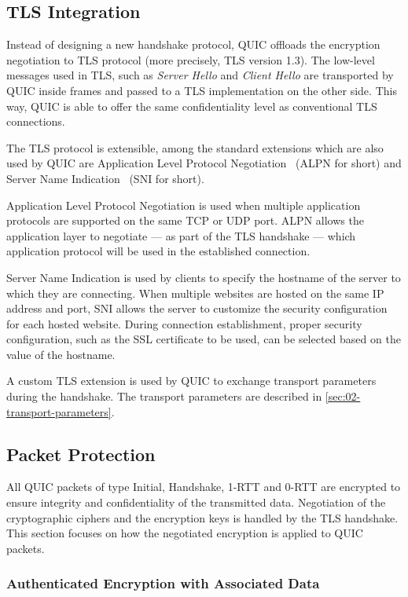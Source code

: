 \subsection{TLS Integration}

Instead of designing a new handshake protocol, QUIC offloads the encryption negotiation to TLS
protocol (more precisely, TLS version 1.3). The low-level messages used in TLS, such as
\textit{Server Hello} and \textit{Client Hello} are transported by QUIC inside \CRYPTO{} frames and
passed to a TLS implementation on the other side. This way, QUIC is able to offer the same
confidentiality level as conventional TLS connections.

The TLS protocol is extensible, among the standard extensions which are also used by QUIC are
Application Level Protocol Negotiation~\cite{rfc7301} (ALPN for short) and Server Name
Indication~\cite{rfc6066} (SNI for short).

Application Level Protocol Negotiation is used when multiple application protocols are supported on
the same TCP or UDP port. ALPN allows the application layer to negotiate --- as part of the TLS
handshake --- which application protocol will be used in the established connection.

Server Name Indication is used by clients to specify the hostname of the server to which they are
connecting. When multiple websites are hosted on the same IP address and port, SNI allows the server
to customize the security configuration for each hosted website. During connection establishment,
proper security configuration, such as the SSL certificate to be used, can be selected based on the
value of the hostname.

A custom TLS extension is used by QUIC to exchange transport parameters during the handshake. The
transport parameters are described in \autoref{sec:02-transport-parameters}.

\subsection{Packet Protection}\label{sec:02-packet-protection}

All QUIC packets of type Initial, Handshake, 1-RTT and 0-RTT are encrypted to ensure integrity and
confidentiality of the transmitted data. Negotiation of the cryptographic ciphers and the encryption
keys is handled by the TLS handshake. This section focuses on how the negotiated encryption is
applied to QUIC packets.

\subsubsection{Authenticated Encryption with Associated Data}

